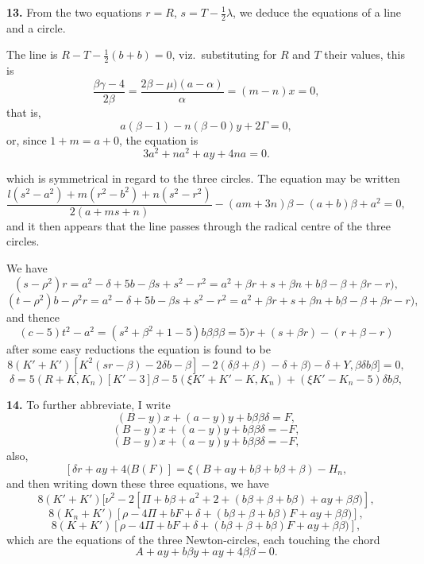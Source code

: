\documentclass[11pt,a4paper]{article}
\begin{document}
\textbf{13.} From the two equations $r = R$, $s = T - \frac{1}{2}\lambda$, we deduce the equations of a line and a circle.

The line is $R - T - \frac{1}{2}(b + b) = 0$, viz.\ substituting for $R$ and $T$ their values, this is
\[
\frac{\beta\gamma - 4}{2\beta} = \frac{2\beta - \mu)(a - \alpha)}{\alpha} = (m - n)x = 0,
\]
that is,
\[
a (\beta - 1) - n(\beta - 0)y + 2\Gamma = 0,
\]
or, since $1 + m = a + 0$, the equation is
\[
3a^2 + na^2 + a y + 4na = 0.
\]

which is symmetrical in regard to the three circles. The equation may be written
\[
\frac{l(s^2 - a^2) + m(r^2 - b^2) + n(s^2 - r^2)}{2(a + ms + n)} - (am + 3n)\beta - (a + b)\beta + a^2 = 0,
\]
and it then appears that the line passes through the radical centre of the three circles.

We have
\[
(s - \rho^2)r = a^2 - \delta + 5b - \beta s + s^2 - r^2 = a^2 + \beta r + s + \beta n + b\beta - \beta + \beta r - r) ,
\]
\[
(t - \rho^2)b - \rho^2 r = a^2 - \delta + 5b - \beta s + s^2 - r^2 = a^2 + \beta r + s + \beta n + b\beta - \beta + \beta r - r) ,
\]
and thence
\[
(c - 5)t^2 - a^2 = (s^2 + \beta^2 + 1 - 5)b\beta\beta\beta = 5)r + (s + \beta r) - (r + \beta - r)
\]
after some easy reductions the equation is found to be
\[
8(K' + K')[K^2 (sr - \beta) - 2\delta b - \beta] - 2(\delta\beta + \beta) - \delta + \beta) - \delta + Y, \beta\delta b\beta] = 0,
\]
\[
\delta = 5(R + K, K_n)[K' - 3]\beta - 5(\xi K' + K' - K, K_n) + (\xi K' - K_n - 5)\delta b\beta,
\]

\textbf{14.} To further abbreviate, I write
\[
(B - y)x + (a - y)y + b\beta\beta\delta = F,
\]
\[
(B - y)x + (a - y)y + b\beta\beta\delta = - F,
\]
\[
(B - y)x + (a - y)y + b\beta\beta\delta = - F,
\]
also,
\[
[\delta r + a y + 4(B(F)] = \xi(B + a y + b\beta + b\beta + \beta) - H_n,
\]
and then writing down these three equations, we have
\[
8(K' + K')[\nu^2 - 2[\Pi + b\beta + a^2 + 2 + (b\beta + \beta + b\beta) + a y + \beta\beta)],
\]
\[
8(K_n + K')[\rho - 4\Pi + bF + \delta + (b\beta + \beta + b\beta)F + a y + \beta\beta)],
\]
\[
8(K + K')[\rho - 4\Pi + bF + \delta + (b\beta + \beta + b\beta)F + a y + \beta\beta)],
\]
which are the equations of the three Newton-circles, each touching the chord
\[
A + a y + b\beta y + a y + 4\beta\beta - 0.
\]
\end{document}
